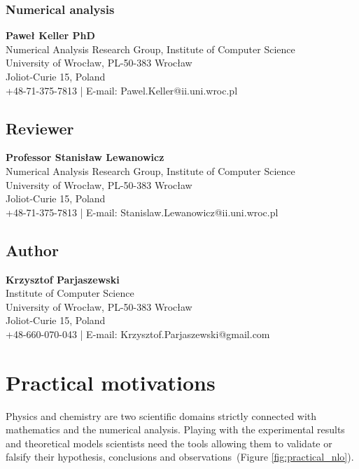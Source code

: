 \documentclass[12pt,twoside,a4paper]{article}
\numberwithin{equation}{subsection}
\numberwithin{figure}{subsection}
\begin{document}
\subsubsection*{Numerical analysis}

\textbf{Paweł Keller PhD} \\
Numerical Analysis Research Group, Institute of Computer Science \\
University of Wrocław, PL-50-383 Wrocław \\
Joliot-Curie 15, Poland \\
+48-71-375-7813 | E-mail: Pawel.Keller@ii.uni.wroc.pl


\subsection*{Reviewer}  \label{chap:abstract_reviewer}

\textbf{Professor Stanisław Lewanowicz} \\
Numerical Analysis Research Group, Institute of Computer Science \\
University of Wrocław, PL-50-383 Wrocław \\
Joliot-Curie 15, Poland \\
+48-71-375-7813 | E-mail: Stanislaw.Lewanowicz@ii.uni.wroc.pl

\subsection*{Author}  \label{chap:abstract_author}

\textbf{Krzysztof Parjaszewski} \\
Institute of Computer Science \\
University of Wrocław, PL-50-383 Wrocław \\
Joliot-Curie 15, Poland \\
+48-660-070-043 | E-mail: Krzysztof.Parjaszewski@gmail.com

\section{Practical motivations} \label{chap:practical_motivations}
Physics and chemistry are two scientific domains strictly connected with mathematics and the numerical analysis. Playing with the
experimental results and theoretical models scientists need the tools allowing them to validate or falsify their hypothesis, conclusions and
observations~(Figure \ref{fig:practical_nlo}).
\end{document}
